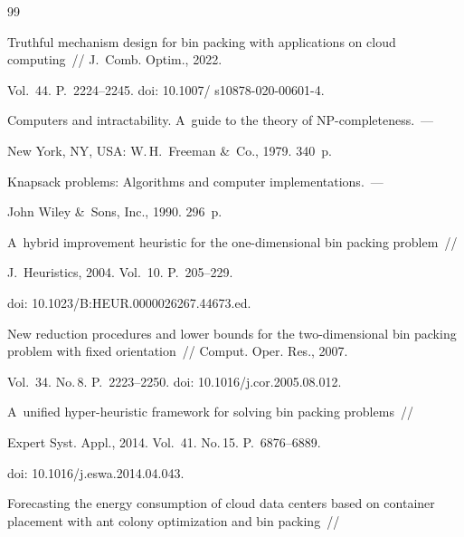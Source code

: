 {{\begin{thebibliography}{99}

Truthful mechanism design for bin packing with applications on cloud computing~/\!\!/ J.~Comb. Optim., 2022. 

Vol.~44. P.~2224--2245. doi: 10.1007\!/ s10878-020-00601-4.


 Computers and intractability. A~guide to the theory of NP-completeness.~--- 

New York, NY, USA: W.\,H.~Freeman \&~Co., 1979. 340~p.


 Knapsack problems: Algorithms and computer implementations.~--- 

 John Wiley \&~Sons, Inc., 1990. 296~p.





A~hybrid improvement heuristic for the one-dimensional bin packing problem~/\!\!/ 

J.~Heuristics, 2004. Vol.~10. P.~205--229. 

doi: 10.1023\!/\!B:HEUR.0000026267.44673.ed.





New reduction procedures and lower bounds for the two-dimensional bin packing problem with fixed orientation~/\!\!/ Comput. Oper. Res., 2007. 

Vol.~34. No.\,8. P.~2223--2250. doi: 10.1016\!/\!j.cor.2005.08.012.





A~unified hyper-heuristic framework for solving bin packing problems~/\!\!/ 

Expert Syst. Appl., 2014. Vol.~41. No.\,15. P.~6876--6889. 

doi: 10.1016\!/\!j.eswa.2014.04.043.



Forecasting the energy consumption of cloud data centers based on container placement with ant colony optimization and bin packing~/\!\!/ 


\end{thebibliography}}}
